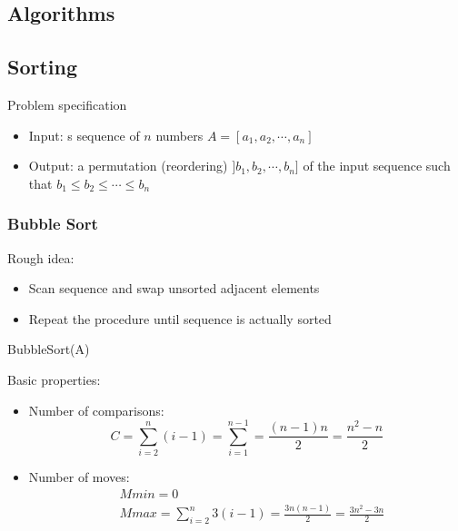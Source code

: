 \subsection{Algorithms}

\subsection{Sorting}
Problem specification
\begin{itemize}
    \item Input: s sequence of $n$ numbers $A=[a_1,a_2,\cdots,a_n]$
    \item Output: a permutation (reordering) $]b_1,b_2,\cdots,b_n]$ of the input sequence such that $b_1 \leq b_2 \leq \cdots \leq b_n$
\end{itemize}

\subsubsection{Bubble Sort}
Rough idea:
\begin{itemize}
    \item Scan sequence and swap unsorted adjacent elements
    \item Repeat the procedure until sequence is actually sorted
\end{itemize}

\begin{center}
\begin{minipage}{0.4\textwidth}
\begin{algorithm}[H]
\caption{BubbleSort(A)}
\end{algorithm}
\end{minipage}
\end{center}

Basic properties: 
\begin{itemize}
    \item Number of comparisons:
    \[
    C = \sum_{i=2}^n(i-1)=\sum_{i=1}^{n-1}=\frac{(n-1)n}{2}=\frac{n^2-n}{2}
    \]
    \item Number of moves:
    \begin{align*}
        &Mmin=0 \\
        &Mmax = \sum_{i=2}^n 3(i-1) = \frac{3n(n-1)}{2} = \frac{3n^2-3n}{2}
    \end{align*}
\end{itemize}



